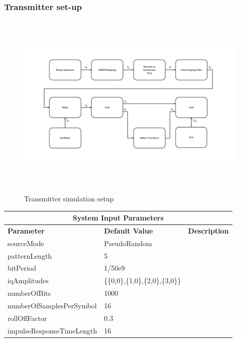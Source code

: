 \subsubsection{Transmitter set-up}
\begin{figure}[h]
	\centering
	\includegraphics[width=1.0\textwidth, height=9cm]{./sdf/simplified_coherent_receiver/figures/Simulation_setup_Tx.pdf}
	\caption{Transmitter simulation setup}\label{Simulation_setup_Tx}
\end{figure}

\begin{center}
	\begin{tabular}{ |p{5cm}||p{3.5cm}|p{5.5cm}|  }
		\hline
		\multicolumn{3}{|c|}{\textbf{System Input Parameters }} \\
		\hline
		\textbf{Parameter} &  \textbf{Default Value} & \textbf{Description}\\
		\hline
		sourceMode    & PseudoRandom &\\
		patternLength & 5      & \\
		bitPeriod     & 1/50e9 & \\
		iqAmplitudes  &\{\{0,0\},\{1,0\},\{2,0\},\{3,0\}\} &\\
		numberOfBits  &   1000 & \\
		numberOfSamplesPerSymbol& 16  &\\
		rollOffFactor & 0.3    & \\
		impulseResponseTimeLength&16&\\
		\hline
	\end{tabular}
\end{center}

